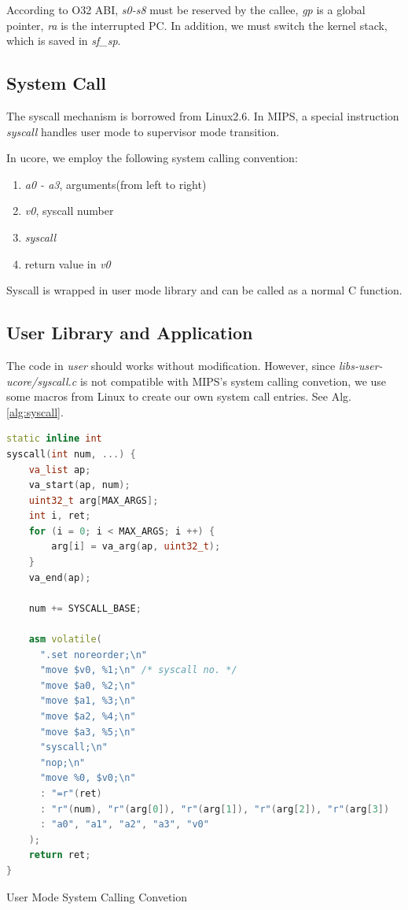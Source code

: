 \documentclass[a4paper]{article}
\begin{document}
According to O32 ABI, \emph{s0-s8} must be reserved by the callee,
\emph{gp} is a global pointer, \emph{ra} is the interrupted PC.
In addition, we must switch the kernel stack, which is saved in \emph{sf\_sp}.


\subsection{System Call}
The syscall mechanism is borrowed from Linux2.6. In MIPS, a special 
instruction \emph{syscall} handles user mode to supervisor mode transition.

In ucore, we employ the following system calling convention:
\begin{enumerate}
  \item \emph{a0 - a3}, arguments(from left to right)
  \item \emph{v0}, syscall number
  \item \emph{syscall}
  \item return value in \emph{v0}
\end{enumerate}

Syscall is wrapped in user mode library and can be called as a normal 
C function. 

\subsection{User Library and Application}
The code in \emph{user}
should works without modification. However, since \emph{libs-user-ucore/syscall.c} is not compatible with MIPS's 
system calling convetion, we use some macros from Linux
to create our own system call entries. See Alg. \ref{alg:syscall}.

\begin{algorithm}[h]
 \begin{lstlisting}[language={C++}]
static inline int
syscall(int num, ...) {
    va_list ap;
    va_start(ap, num);
    uint32_t arg[MAX_ARGS];
    int i, ret;
    for (i = 0; i < MAX_ARGS; i ++) {
        arg[i] = va_arg(ap, uint32_t);
    }
    va_end(ap);

    num += SYSCALL_BASE;

    asm volatile(
      ".set noreorder;\n"
      "move $v0, %1;\n" /* syscall no. */
      "move $a0, %2;\n"
      "move $a1, %3;\n"
      "move $a2, %4;\n"
      "move $a3, %5;\n"
      "syscall;\n"
      "nop;\n"
      "move %0, $v0;\n"
      : "=r"(ret)
      : "r"(num), "r"(arg[0]), "r"(arg[1]), "r"(arg[2]), "r"(arg[3]) 
      : "a0", "a1", "a2", "a3", "v0"
    );
    return ret;
}

\end{lstlisting}
\caption{User Mode System Calling Convetion}
\label{alg:syscall}
\end{algorithm}
\end{document}
